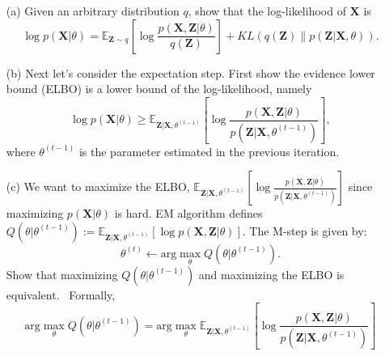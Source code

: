 \documentclass[10pt]{article}
\begin{document}
\begin{enumerate}[1.]
        \begin{itemize}
            \item[(a)] Given an arbitrary distribution $q$, show that the log-likelihood of $\boldsymbol{X}$ is~
                \begin{equation}
                    \log p(\boldsymbol{X}|\theta) = \mathbb{E}_{\boldsymbol{Z}\sim q}\left [ \log  \frac{p(\boldsymbol{X}, \boldsymbol{Z}|\theta)}{q(\boldsymbol{Z})}\right ] + KL\left(q(\boldsymbol{Z})\| p(\boldsymbol{Z}|\boldsymbol{X},\theta)\right).
                \end{equation}
            \item[(b)] Next let's consider the expectation step. First show the evidence lower bound (ELBO) is a lower bound of the log-likelihood, namely~
                \begin{equation}
                    \log p(\boldsymbol{X}|\theta)\geq\mathbb{E}_{\boldsymbol{Z}|\boldsymbol{X},\theta^{(t-1)}}\left[\log \frac{p(\boldsymbol{X},\boldsymbol{Z}|\theta)}{p(\boldsymbol{Z}|\boldsymbol{X},\theta^{(t-1)})}\right],
                \end{equation}
                where $\theta^{(t-1)}$ is the parameter estimated in the previous iteration.
            \item[(c)] We want to maximize the ELBO, $\mathbb{E}_{\boldsymbol{Z}|\boldsymbol{X},\theta^{(t-1)}}\left[\log \frac{p(\boldsymbol{X},\boldsymbol{Z}|\theta)}{p(\boldsymbol{Z}|\boldsymbol{X},\theta^{(t-1)})}\right]$ since maximizing $p(\boldsymbol{X}|\theta)$ is hard. EM algorithm defines $Q(\theta|\theta^{(t-1)}) := \mathbb{E}_{\boldsymbol{Z}|\boldsymbol{X},\theta^{(t-1)}}\left[ \log p(\boldsymbol{X},\boldsymbol{Z}|\theta) \right]$. The M-step is given by:
                \begin{equation}
                    \theta^{(t)} \leftarrow \text{arg}\max_{\theta} Q(\theta|\theta^{(t-1)}). 
                \end{equation}
                Show that maximizing $Q(\theta|\theta^{(t-1)})$ and maximizing the ELBO is equivalent.~ Formally,
                \begin{equation}
                    \text{arg}\max_{\theta} Q(\theta|\theta^{(t-1)}) = \text{arg}\max_{\theta} \mathbb{E}_{\boldsymbol{Z}|\boldsymbol{X},\theta^{(t-1)}}\left[\log \frac{p(\boldsymbol{X},\boldsymbol{Z}|\theta)}{p(\boldsymbol{Z}|\boldsymbol{X},\theta^{(t-1)})}\right]
                \end{equation}


\end{itemize}
\end{enumerate}
\end{document}
